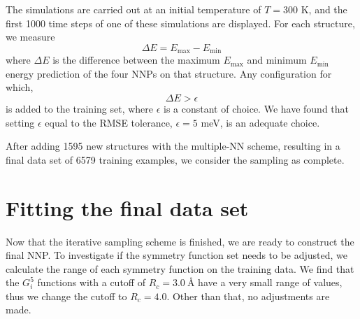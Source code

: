 \documentclass[twoside,english]{uiofysmaster}
\begin{document}
The simulations are carried out at an initial temperature of $T = 300$ K, and the first 1000 time steps 
of one of these simulations are displayed. For each structure, we measure
\begin{equation}
 \Delta E = E_{\max} - E_{\min}
\end{equation}
where $\Delta E$ is the difference between the maximum $E_{\max}$ and minimum $E_{\min}$ energy prediction
of the four NNPs on that structure. Any configuration for which, 
\begin{equation}
 \Delta E > \epsilon
\end{equation}
is added to the training set, where $\epsilon$ is a constant of choice. We have found that setting 
$\epsilon$ equal to the RMSE tolerance, $\epsilon=5$ meV, is an adequate choice. 

After adding 1595 new structures with the multiple-NN scheme, resulting in a final data set of 6579 training examples,
we consider the sampling as complete.



\section{Fitting the final data set}
Now that the iterative sampling scheme is finished, we are ready to construct the final NNP. 
To investigate if the symmetry function set needs to be adjusted, we calculate the range of each symmetry function 
on the training data. We find that the $G_i^5$ functions with a cutoff of $R_c = \SI{3.0}{\angstrom}$ have a very small range 
of values, thus we change the cutoff to $R_c = 4.0$. Other than that, no adjustments are made. 
\end{document}
